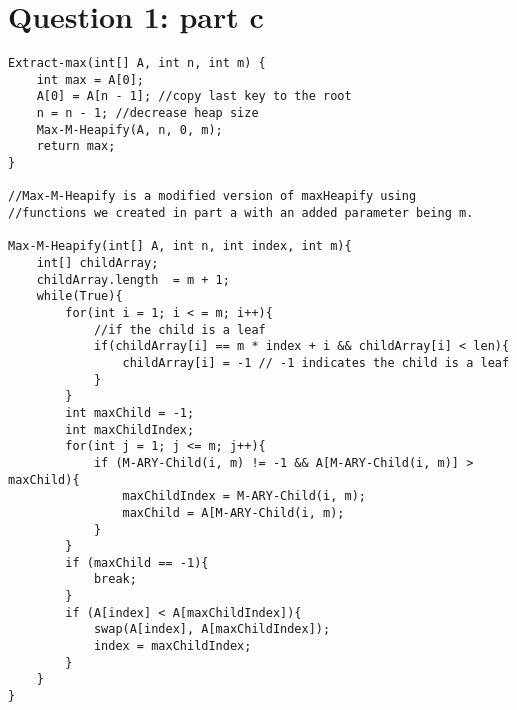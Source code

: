 \documentclass{article}
\begin{document}




\section{Question 1: part c}
\begin{lstlisting}
Extract-max(int[] A, int n, int m) { 
    int max = A[0];                                     
    A[0] = A[n - 1]; //copy last key to the root        
    n = n - 1; //decrease heap size                     
    Max-M-Heapify(A, n, 0, m);                          
    return max;                                         
}

//Max-M-Heapify is a modified version of maxHeapify using 
//functions we created in part a with an added parameter being m.

Max-M-Heapify(int[] A, int n, int index, int m){
    int[] childArray;                                                       
    childArray.length  = m + 1;                                             
    while(True){                                                            
        for(int i = 1; i < = m; i++){                                       
            //if the child is a leaf                                        
            if(childArray[i] == m * index + i && childArray[i] < len){      
                childArray[i] = -1 // -1 indicates the child is a leaf      
            }                                                               
        }                                                                   
        int maxChild = -1;                                                  
        int maxChildIndex;                                                  
        for(int j = 1; j <= m; j++){                                        
            if (M-ARY-Child(i, m) != -1 && A[M-ARY-Child(i, m)] > maxChild){
                maxChildIndex = M-ARY-Child(i, m);                           
                maxChild = A[M-ARY-Child(i, m);                             
            } 
        }
        if (maxChild == -1){                                                
            break;                                                          
        }
        if (A[index] < A[maxChildIndex]){                                   
            swap(A[index], A[maxChildIndex]);                               
            index = maxChildIndex;                                          
        }
    }
}
\end{lstlisting}
\end{document}
